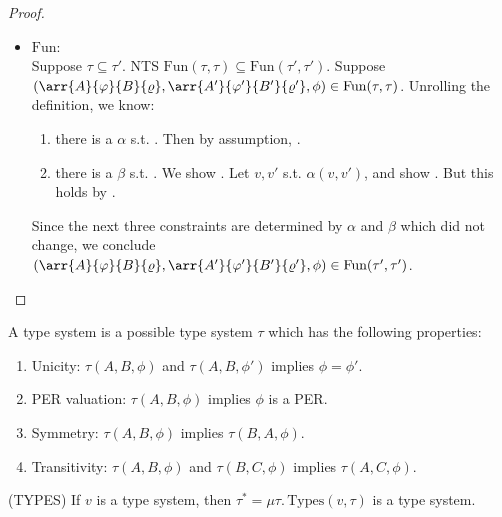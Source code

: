 \begin{proof}

\begin{itemize}
\item $\text{Fun}$:\\
Suppose $\tau \subseteq \tau'$. NTS $\text{Fun}(\tau,\tau) \subseteq \text{Fun}(\tau',\tau')$. 
Suppose $(\arr{A}{\varphi}{B}{\varrho}, \arr{A'}{\varphi'}{B'}{\varrho'}, \phi)  \in \text{Fun}(\tau,\tau)$. 
Unrolling the definition, we know:
\begin{enumerate}
  \item there is a $\alpha$ s.t. . Then by assumption, . 
  \item there is a $\beta$ s.t. . We show
. Let $v,v'$ s.t. $\alpha(v,v')$, and show 
. But this holds by .
\end{enumerate}
Since the next three constraints are determined by $\alpha$ and $\beta$ which did not change, we conclude 
$(\arr{A}{\varphi}{B}{\varrho}, \arr{A'}{\varphi'}{B'}{\varrho'}, \phi)  \in \text{Fun}(\tau',\tau')$.
\end{itemize}
\end{proof}
\fi

A type system is a possible type system $\tau$ which has the following properties:
\begin{enumerate}
\item Unicity: $\tau(A,B,\phi)$ and $\tau(A,B,\phi')$ implies $\phi = \phi'$.
\item PER valuation: $\tau(A,B,\phi)$ implies $\phi$ is a PER.
\item Symmetry: $\tau(A,B,\phi)$ implies $\tau(B,A,\phi)$. 
\item Transitivity: $\tau(A,B,\phi)$ and $\tau(B,C,\phi)$ implies $\tau(A,C,\phi)$.
\end{enumerate}

\begin{lemma}(TYPES)\label{lemma:types}
If $v$ is a type system, then $\tau^* = \mu \tau.\, \text{Types}(v,\tau)$ is a type system.
\end{lemma}

